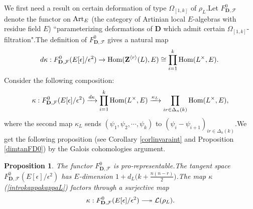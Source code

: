 \documentclass[SecEq,CM,GP]{degruyter-crelle} %
\theoremstyle{plain}
\newtheorem{pro}[thm]{Proposition}
\newcommand{\twoheadlongrightarrow}{\relbar\joinrel\twoheadrightarrow}
\newcommand{\Art}{{\rm Art}}
\newcommand{\Dpik}{{\mathbf{D}}}
\newcommand{\homo}{{\rm Hom}}
\newcommand{\lrr}{{\langle r\rangle}}
\newcommand{\omepik}{\Omega_{[1,k]}}
\newcommand{\bZ}{{\mathbf{Z}}}
\newcommand{\cF}{\mathcal F}
\newcommand{\sL}{\mathcal L}
\begin{document}
We first need a result on certain deformation of type $\omepik$ of $\rho_L$.\;Let $F_{\Dpik,\cF}^0$ denote the functor on $\Art_E$ (the category of Artinian local $E$-algebras with residue field $E$) ``parameterizing deformations of $\Dpik$ which admit certain $\omepik$-filtration".\;The definition of $F_{\Dpik,\cF}^0$ gives a natural map \[d\kappa:F_{\Dpik,\cF}^0(E[\epsilon]/\epsilon^2)\rightarrow
\homo(\bZ^{\lrr}(L),E)\cong \prod_{i=1}^k\homo(L^\times,E).\;\]Consider the  following composition:
\begin{equation}\label{introkappakappaL}
	\kappa:F_{\Dpik,\cF}^0(E[\epsilon]/\epsilon^2)\xrightarrow{d\kappa}  \prod_{i=1}^k\homo(L^\times,E)\xrightarrow{\kappa_L} \prod_{ir\in \Delta_n(k)}\homo(L^\times,E),
\end{equation}
where the second map $\kappa_L$ sends $(\psi_1,\psi_2,\cdots,\psi_k)$ to $(\psi_i-\psi_{i+1})_{ir\in \Delta_n(k)}$.\;We get the following proposition (see Corollary \ref{corlinvaraint} and Proposition \ref{dimtanFD0}) by the Galois cohomologies argument.\;

\begin{pro}\label{introdimeF0D}The functor $F_{\Dpik,\cF}^0$ is  pro-representable.\;The tangent space $F_{\Dpik,\cF}^0(E[\epsilon]/\epsilon^2)$ has $E$-dimension $1+d_L\Big(k+\frac{n(n-r)}{2}\Big)$.\;The map $\kappa$ (\ref{introkappakappaL})  factors through a surjective map
	\[\kappa:F_{\Dpik,\cF}^0(E[\epsilon]/\epsilon^2)\twoheadlongrightarrow \sL(\rho_L).\]
\end{pro}
\end{document}
